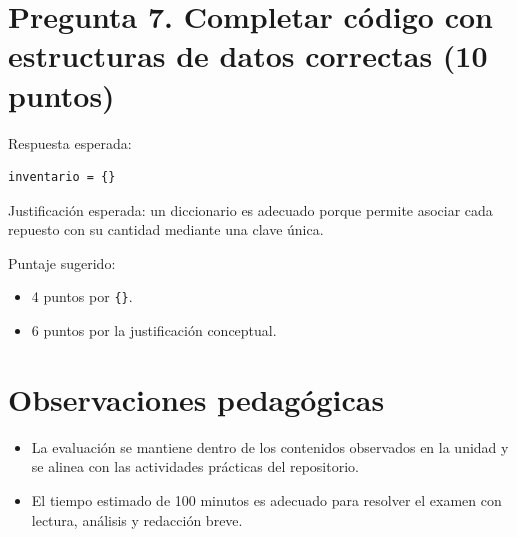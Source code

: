 \documentclass[12pt]{article}
\begin{document}
\section*{Pregunta 7. Completar c\'odigo con estructuras de datos correctas (10 puntos)}
Respuesta esperada:
\begin{verbatim}
inventario = {}
\end{verbatim}
Justificaci\'on esperada: un diccionario es adecuado porque permite asociar cada repuesto con su cantidad mediante una clave \'unica.

Puntaje sugerido:
\begin{itemize}[leftmargin=1.2em]
    \item 4 puntos por \texttt{\{\}}.
    \item 6 puntos por la justificaci\'on conceptual.
\end{itemize}

\section*{Observaciones pedag\'ogicas}
\begin{itemize}[leftmargin=1.2em]
    \item La evaluaci\'on se mantiene dentro de los contenidos observados en la unidad y se alinea con las actividades pr\'acticas del repositorio.
    \item El tiempo estimado de 100 minutos es adecuado para resolver el examen con lectura, an\'alisis y redacci\'on breve.
\end{itemize}
\end{document}
